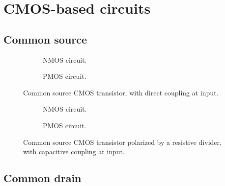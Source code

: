 
\chapter{CMOS-based circuits}



\section{Common source}


	\begin{figure}[htb]
		\centering
		\begin{subfigure}[b]{0.49\textwidth}
			\centering
			
			\caption{NMOS circuit.%
				\label{fig__mos_nmos_common_source_direct_coupling}}
		\end{subfigure}
		\hfill
		\begin{subfigure}[b]{0.49\textwidth}
			\centering
			
			\caption{PMOS circuit.%
				\label{fig__mos_pmos_common_source_direct_coupling}}
		\end{subfigure}
		\caption{Common source CMOS transistor, with direct coupling at input.%
			\label{fig__mos_common_source_direct_coupling}}
	\end{figure}

	\begin{figure}[htb]
		\centering
		\begin{subfigure}[b]{0.49\textwidth}
			\centering
			
			\caption{NMOS circuit.%
				\label{fig__mos_nmos_common_source_Rdiv_pol_C_coupling}}
		\end{subfigure}
		\hfill
		\begin{subfigure}[b]{0.49\textwidth}
			\centering
			
			\caption{PMOS circuit.%
				\label{fig__mos_pmos_common_source_Rdiv_pol_C_coupling}}
		\end{subfigure}
		\caption{Common source CMOS transistor polarized by a resistive divider, with capacitive coupling at input.%
			\label{fig__mos_common_source_Rdiv_pol_C_coupling}}
	\end{figure}



\section{Common drain}


